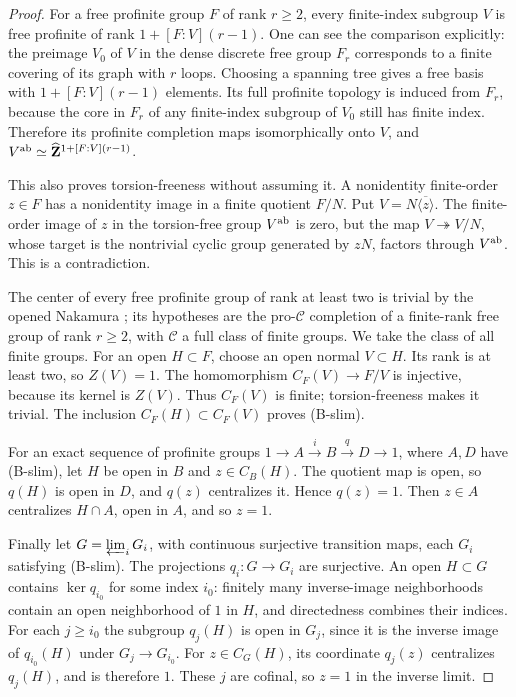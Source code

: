 \begin{proof}
For a free profinite group $F$ of rank $r\ge2$, every finite-index subgroup
$V$ is free profinite of rank $1+[F:V](r-1)$. One can see the comparison
explicitly: the preimage $V_0$ of $V$ in the dense discrete free group
$F_r$ corresponds to a finite covering of its graph with $r$ loops.
Choosing a spanning tree gives a free basis with
$1+[F:V](r-1)$ elements. Its full profinite topology is induced from $F_r$,
because the core in $F_r$ of any finite-index subgroup of $V_0$ still has
finite index. Therefore its profinite completion maps isomorphically onto
$V$, and $V^{\rm ab}\simeq\widehat{\mathbf Z}^{1+[F:V](r-1)}$.

This also proves torsion-freeness without assuming it. A nonidentity
finite-order $z\in F$ has a nonidentity image in a finite quotient $F/N$.
Put $V=N\overline{\langle z\rangle}$. The finite-order image of $z$ in
the torsion-free group $V^{\rm ab}$ is zero, but the map
$V\twoheadrightarrow V/N$, whose target is the nontrivial cyclic group
generated by $zN$, factors through $V^{\rm ab}$. This is a contradiction.

The center of every free profinite group of rank at least two is trivial
by the opened Nakamura \cite[Corollary (1.3.4)]{B_Nakamura1994}; its
hypotheses are the pro-$\mathcal C$ completion of a finite-rank free group
of rank $r\ge2$, with $\mathcal C$ a full class of finite groups. We take
the class of all finite groups. For an open $H\subset F$, choose an open
normal $V\subset H$. Its rank is at least two, so $Z(V)=1$.
The homomorphism $C_F(V)\to F/V$ is injective, because its kernel is
$Z(V)$. Thus $C_F(V)$ is finite; torsion-freeness makes it trivial.
The inclusion $C_F(H)\subset C_F(V)$ proves (B-slim).

For an exact sequence of profinite groups
$1\to A\xrightarrow{i}B\xrightarrow{q}D\to1$, where $A,D$ have
(B-slim), let $H$ be open in $B$ and $z\in C_B(H)$. The quotient map is
open, so $q(H)$ is open in $D$, and $q(z)$ centralizes it. Hence $q(z)=1$.
Then $z\in A$ centralizes $H\cap A$, open in $A$, and so $z=1$.

Finally let $G=\varprojlim_iG_i$, with continuous surjective transition
maps, each $G_i$ satisfying (B-slim). The projections $q_i:G\to G_i$
are surjective. An open $H\subset G$ contains $\ker q_{i_0}$ for some
index $i_0$: finitely many inverse-image neighborhoods contain an open
neighborhood of $1$ in $H$, and directedness combines their indices.
For each $j\ge i_0$ the subgroup $q_j(H)$ is open in $G_j$, since it is
the inverse image of $q_{i_0}(H)$ under $G_j\to G_{i_0}$.
For $z\in C_G(H)$, its coordinate $q_j(z)$ centralizes $q_j(H)$, and is
therefore $1$. These $j$ are cofinal, so $z=1$ in the inverse limit.
\end{proof}

